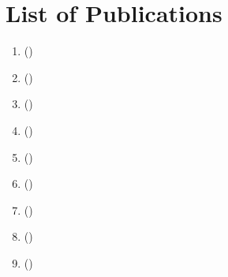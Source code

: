 \chapter*{List of Publications}
\label{sec:ListOfPublications}

\begin{enumerate}
	\item {} (\cite{Biryukov2017})
	\item {} (\cite{Tikhomirov2017})
	\item {} (\cite{Biryukov2018})
	\item {} (\cite{Tikhomirov2018})
	\item {} (\cite{Biryukov2019b})
	\item {} (\cite{Biryukov2019a})
	\item {} (\cite{Biryukov2019})
	\item {} (\cite{Tikhomirov2020a})
	\item {} (\cite{Tikhomirov2020})
\end{enumerate}